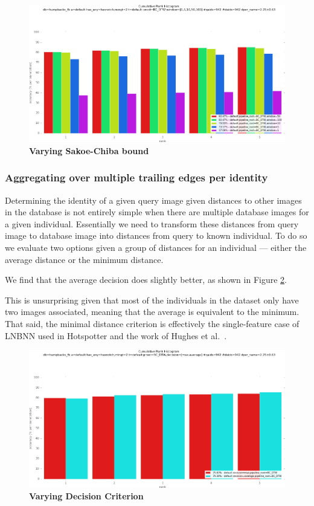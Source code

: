 \begin{figure}[t]%
\centering
\includegraphics[width=1\textwidth]{../images/results/vary_window.png}
\caption{\textbf{Varying Sakoe-Chiba bound}}
\label{fig:vary_window}
\end{figure}

\subsubsection{Aggregating over multiple trailing edges per identity}

Determining the identity of a given query image given distances to other images in the database is not entirely simple when there are multiple database images for a given individual.
Essentially we need to transform these distances from query image to database image into distances from query to known individual.
To do so we evaluate two options given a group of distances for an individual --- either the average distance or the minimum distance.

We find that the average decision does slightly better, as shown in Figure \ref{fig:vary_decision}.

This is unsurprising given that most of the individuals in the dataset only have two images associated, meaning that the average is equivalent to the minimum.
That said, the minimal distance criterion is effectively the single-feature case of LNBNN used in Hotspotter \cite{crall_hotspotter_2013} and the work of Hughes et al.\ \cite{hughes2015automated}. %

\begin{figure}[t]%
\centering
\includegraphics[width=1\textwidth]{../images/results/vary_decision.png}
\caption{\textbf{Varying Decision Criterion}}
\label{fig:vary_decision}
\end{figure}

